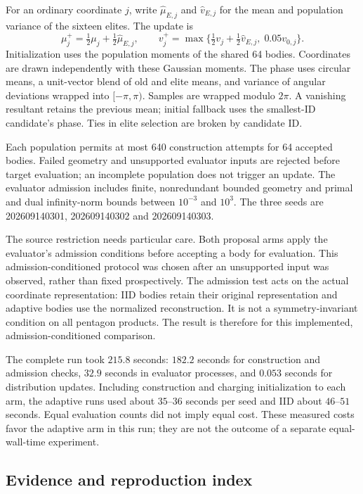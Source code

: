 For an ordinary coordinate $j$, write $\widehat\mu_{E,j}$ and
$\widehat v_{E,j}$ for the mean and population variance of the sixteen elites.
The update is
\[
 \mu_j^+=\tfrac12\mu_j+\tfrac12\widehat\mu_{E,j},\qquad
 v_j^+=\max\{\tfrac12v_j+\tfrac12\widehat v_{E,j},\;0.05v_{0,j}\}.
\]
Initialization uses the population moments of the shared 64 bodies.
Coordinates are drawn independently with these Gaussian moments. The phase
uses circular means, a unit-vector blend of old and elite means, and variance
of angular deviations wrapped into $[-\pi,\pi)$. Samples are wrapped modulo
$2\pi$. A vanishing resultant retains the previous mean; initial fallback
uses the smallest-ID candidate's phase. Ties in elite selection are broken
by candidate ID.

Each population permits at most 640 construction attempts for 64 accepted
bodies. Failed geometry and unsupported evaluator inputs are rejected before
target evaluation; an incomplete population does not trigger an update.
The evaluator admission includes finite, nonredundant bounded geometry and
primal and dual infinity-norm bounds between $10^{-3}$ and $10^3$.
The three seeds are 202609140301, 202609140302 and 202609140303.

The source restriction needs particular care. Both proposal arms apply the
evaluator's admission conditions before accepting a body for evaluation.
This admission-conditioned protocol was chosen after an unsupported input
was observed, rather than fixed prospectively. The admission test acts on
the actual coordinate representation:
IID bodies retain their original representation and adaptive bodies use the
normalized reconstruction. It is not a symmetry-invariant condition on all
pentagon products. The result is therefore for this implemented,
admission-conditioned comparison.

The complete run took $215.8$ seconds: $182.2$ seconds for construction and
admission checks, $32.9$ seconds in evaluator processes, and $0.053$ seconds
for distribution updates. Including construction and charging initialization
to each arm, the adaptive runs used about $35$--$36$ seconds per seed and IID
about $46$--$51$ seconds. Equal evaluation counts did not imply equal cost.
These measured costs favor the adaptive arm in this run; they are not the
outcome of a separate equal-wall-time experiment.


\subsection{Evidence and reproduction index}

